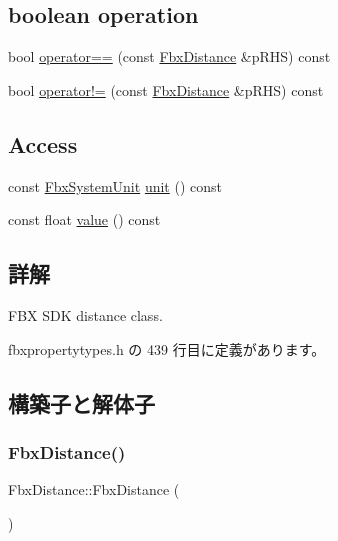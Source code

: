 \subsection*{boolean operation}
\begin{DoxyCompactItemize}
\item 
bool \hyperlink{class_fbx_distance_aaa4847c97c6545a8f439c234960e302a}{operator==} (const \hyperlink{class_fbx_distance}{Fbx\+Distance} \&p\+R\+HS) const
\item 
bool \hyperlink{class_fbx_distance_a71b53170c900475723294c6257ebd861}{operator!=} (const \hyperlink{class_fbx_distance}{Fbx\+Distance} \&p\+R\+HS) const
\end{DoxyCompactItemize}
\subsection*{Access}
\begin{DoxyCompactItemize}
\item 
const \hyperlink{class_fbx_system_unit}{Fbx\+System\+Unit} \hyperlink{class_fbx_distance_a205e0b8479de5b96079473facb81926c}{unit} () const
\item 
const float \hyperlink{class_fbx_distance_a00bb7d52cd3f2494429bf7126764d2c4}{value} () const
\end{DoxyCompactItemize}


\subsection{詳解}
F\+BX S\+DK distance class. 

 fbxpropertytypes.\+h の 439 行目に定義があります。



\subsection{構築子と解体子}
\mbox{\label{class_fbx_distance_a2584c33efb6d9aac6118abb470592c67}} 
\subsubsection{\texorpdfstring{Fbx\+Distance()}{FbxDistance()}\hspace{0.1cm}{\footnotesize\ttfamily [1/3]}}
{\footnotesize\ttfamily Fbx\+Distance\+::\+Fbx\+Distance (\begin{DoxyParamCaption}{ }\end{DoxyParamCaption})}



